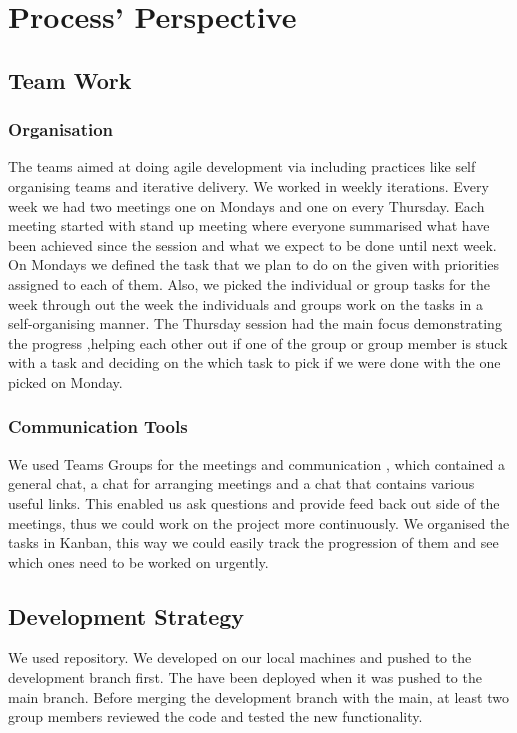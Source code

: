\documentclass[report/main.tex]{subfiles}
\begin{document}
    \section{Process' Perspective}
    \label{Sec:process_perspective}
        \subsection{Team Work}
            \subsubsection{Organisation}
                
                The teams aimed at doing agile development via including practices like self organising teams and iterative delivery. We worked in weekly iterations. Every week we had two meetings one on Mondays and one on every Thursday. Each meeting started with stand up meeting where everyone summarised what have been achieved since the session and what we expect to be done until next week. On Mondays we defined the task that we plan to do on the given with priorities assigned to each of them. Also, we picked the individual or group tasks for the week through out the week the individuals and groups work on the tasks in a self-organising manner. The Thursday session had the main focus demonstrating the progress ,helping each other out if one of the group or group member is stuck with a task and deciding on the which task to pick if we were done with the one picked on Monday.
        
            
            \subsubsection{Communication Tools}
                
                We used Teams Groups for the meetings and communication , which contained a general chat, a chat for arranging meetings and a chat that contains various useful links. This enabled us ask questions and provide feed back out side of the meetings, thus we could work on the project more continuously. We organised the tasks in Kanban, this way we could easily track the progression of them and see which ones need to be worked on urgently.  

        \subsection{Development Strategy}
            We used  repository. We developed on our local machines and pushed to the development branch first. The have been deployed when it was pushed to the main branch. Before merging the development branch with the main, at least two group members reviewed the code and tested the new functionality.
            
\end{document}
